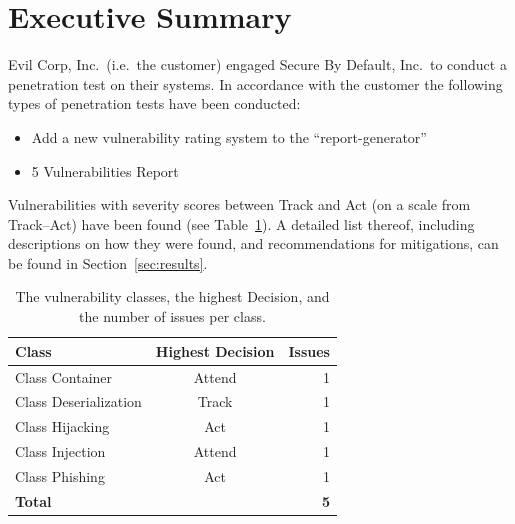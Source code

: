 \documentclass[a4paper]{article}
\begin{document}
\clearpage
\section*{Executive Summary}

Evil Corp, Inc.\ (i.e.\ the customer) engaged Secure By Default, Inc.\ to conduct a penetration test on their systems.
In accordance with the customer the following types of penetration tests have been conducted:

\begin{itemize}
      \item Add a new vulnerability rating system to the ``report-generator''

      \item 5 Vulnerabilities Report

  \end{itemize}




 Vulnerabilities with severity scores between Track and Act (on a scale from Track--Act) have been found (see Table~\ref{tab:vulnerabilities}).
  A detailed list thereof, including descriptions on how they were found, and recommendations for mitigations, can be found in Section~\ref{sec:results}.


  \begin{table}[h!]
    \centering
    \caption{The vulnerability classes, the highest Decision, and the number of issues per class.}
    \label{tab:vulnerabilities}
    \begin{tabular}{lcr}
      \textbf{Class} & \textbf{Highest Decision} & \textbf{Issues} \\
      \hline
              Class Container & Attend} & 1 \\
              Class Deserialization & Track} & 1 \\
              Class Hijacking & Act} & 1 \\
              Class Injection & Attend} & 1 \\
              Class Phishing & Act} & 1 \\
            \hline
      \textbf{Total} & ~ & \textbf{5}
    \end{tabular}
  \end{table}

\end{document}
